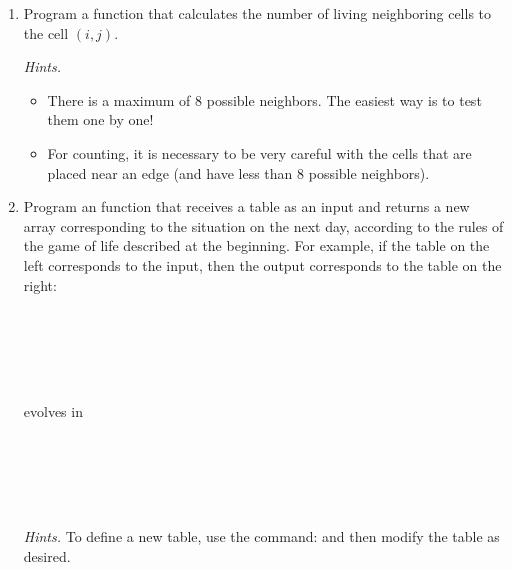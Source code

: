 \documentclass[11pt,class=report,crop=false]{standalone}
\begin{document}
\begin{activite}[Evolution]


\begin{enumerate}
  \item Program a  function that calculates the number of living neighboring cells to the cell $(i,j)$.
  
  \emph{Hints.}
  \begin{itemize}
    \item There is a maximum of $8$ possible neighbors. The easiest way is to test them one by one!
    \item For counting, it is necessary to be very careful with the cells that are placed near an edge (and have less than $8$ possible neighbors).
  \end{itemize}
  
  \item Program an  function that receives a table as an input and returns a new array corresponding to the situation on the next day, according to the rules of the game of life described at the beginning.
 For example, if the table on the left corresponds to the input, then the output corresponds to the table on the right:

\begin{center}
\begin{minipage}{0.3\textwidth}
\begin{center}
\\
\\
\\
\\
\end{center}
\end{minipage} 
 evolves in  
\begin{minipage}{0.3\textwidth}
\begin{center}
\\
\\
\\
\\
\end{center}
\end{minipage} 
\end{center}

  \emph{Hints.} To define a new table, use the command:  
  and then modify the table as desired.

\end{enumerate}
\end{activite}
\end{document}
